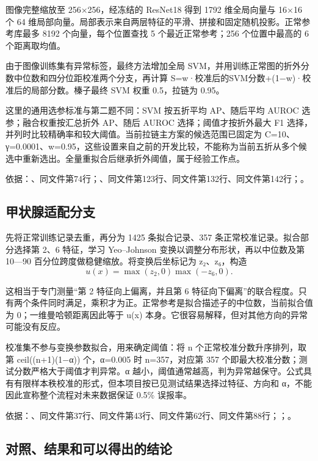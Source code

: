 \documentclass[UTF8,fontset=windows,11pt,a4paper]{ctexart}
\begin{document}
图像完整缩放至 256×256，经冻结的 ResNet18 得到 1792 维全局向量与 16×16 个 64 维局部向量。局部表示来自两层特征的平滑、拼接和固定随机投影。正常参考库最多 8192 个向量，每个位置查找 5 个最近正常参考；256 个位置中最高的 6 个距离取均值。

由于图像训练集有异常标签，最终方法增加全局 SVM，并用训练正常图的折外分数中位数和四分位距校准两个分支，再计算 S=w·校准后的SVM分数+(1−w)·校准后的局部分数。榛子最终 SVM 权重 0.5，拉链为 0.95。

这里的通用选参标准与第二题不同：SVM 按五折平均 AP、随后平均 AUROC 选参；融合权重按汇总折外 AP、随后 AUROC 选择；阈值才按折外最大 F1 选择，并列时比较精确率和较大阈值。当前拉链主方案的候选范围已固定为 C=10、γ=0.0001、w=0.95，这些设置来自之前的开发比较，不能称为当前五折从多个候选中重新选出。全量重拟合后继承折外阈值，属于经验工作点。

依据：、同文件第74行；、同文件第123行、同文件第132行、同文件第142行；。

\subsection{甲状腺适配分支}

先将正常训练记录去重，再分为 1425 条拟合记录、357 条正常校准记录。拟合部分选择第 2、6 特征，学习 Yeo–Johnson 变换以调整分布形状，再以中位数及第 10—90 百分位跨度做稳健缩放。将变换后坐标记为 z₂、z₆，构造
\[
u(x)=\max(z_2,0)\max(-z_6,0).
\]

这相当于专门测量“第 2 特征向上偏离，并且第 6 特征向下偏离”的联合程度。只有两个条件同时满足，乘积才为正。正常参考是拟合描述子的中位数，当前拟合值为 0；一维曼哈顿距离因此等于 u(x) 本身。它很容易解释，但对其他方向的异常可能没有反应。

校准集不参与变换参数拟合，用来确定阈值：将 n 个正常校准分数升序排列，取第 ceil((n+1)(1−α)) 个，α=0.005 时 n=357，对应第 357 个即最大校准分数；测试分数严格大于阈值才判异常。α 越小，阈值通常越高，判为异常越保守。公式具有有限样本秩校准的形式，但本项目按已见测试结果选择过特征、方向和 α，不能因此宣称整个流程对未来数据保证 0.5\% 误报率。

依据：、同文件第37行、同文件第43行、同文件第62行、同文件第88行；；。

\subsection{对照、结果和可以得出的结论}
\end{document}

